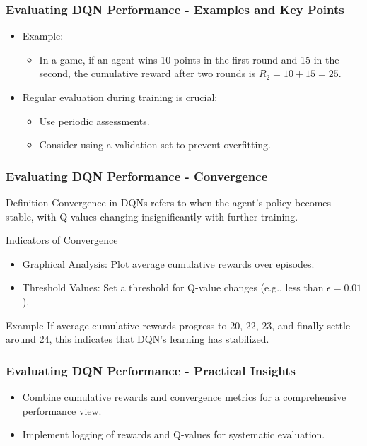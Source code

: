\documentclass{beamer}
\begin{document}
\begin{frame}[fragile]
    \frametitle{Evaluating DQN Performance - Examples and Key Points}
    \begin{itemize}
        \item Example: 
        \begin{itemize}
            \item In a game, if an agent wins 10 points in the first round and 15 in the second, the cumulative reward after two rounds is \( R_2 = 10 + 15 = 25 \).
        \end{itemize}
    
        \item Regular evaluation during training is crucial:
        \begin{itemize}
            \item Use periodic assessments.
            \item Consider using a validation set to prevent overfitting.
        \end{itemize}
    \end{itemize}
\end{frame}

\begin{frame}[fragile]
    \frametitle{Evaluating DQN Performance - Convergence}
    \begin{block}{Definition}
        Convergence in DQNs refers to when the agent's policy becomes stable, with Q-values changing insignificantly with further training.
    \end{block}
    \begin{block}{Indicators of Convergence}
        \begin{itemize}
            \item Graphical Analysis: Plot average cumulative rewards over episodes.
            \item Threshold Values: Set a threshold for Q-value changes (e.g., less than \( \epsilon = 0.01 \)).
        \end{itemize}
    \end{block}
    \begin{block}{Example}
        If average cumulative rewards progress to 20, 22, 23, and finally settle around 24, this indicates that DQN's learning has stabilized.
    \end{block}
\end{frame}

\begin{frame}[fragile]
    \frametitle{Evaluating DQN Performance - Practical Insights}
    \begin{itemize}
        \item Combine cumulative rewards and convergence metrics for a comprehensive performance view.
        \item Implement logging of rewards and Q-values for systematic evaluation.
    \end{itemize}
\end{frame}
\end{document}
